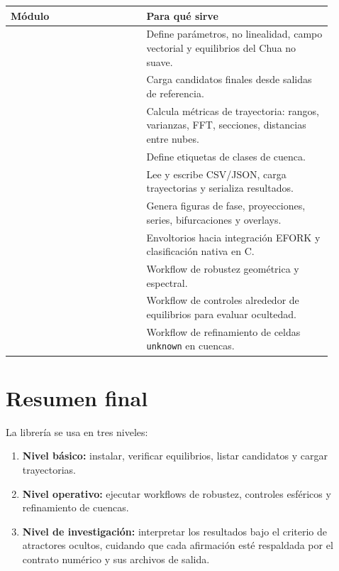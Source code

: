 \documentclass[11pt,letterpaper]{article}
\begin{document}
\begin{center}
\begin{tabular}{L{0.38\linewidth}L{0.52\linewidth}}
\toprule
Módulo & Para qué sirve \\
\midrule
{} & Define parámetros, no linealidad, campo vectorial y equilibrios del Chua no suave. \\
 & Carga candidatos finales desde salidas de referencia. \\
 & Calcula métricas de trayectoria: rangos, varianzas, FFT, secciones, distancias entre nubes. \\
 & Define etiquetas de clases de cuenca. \\
 & Lee y escribe CSV/JSON, carga trayectorias y serializa resultados. \\
 & Genera figuras de fase, proyecciones, series, bifurcaciones y overlays. \\
 & Envoltorios hacia integración EFORK y clasificación nativa en C. \\
 & Workflow de robustez geométrica y espectral. \\
 & Workflow de controles alrededor de equilibrios para evaluar ocultedad. \\
 & Workflow de refinamiento de celdas \texttt{unknown} en cuencas. \\
\bottomrule
\end{tabular}
\end{center}

\section{Resumen final}

La librería se usa en tres niveles:

\begin{enumerate}[label=\arabic*)]
  \item \textbf{Nivel básico:} instalar, verificar equilibrios, listar candidatos y cargar trayectorias.
  \item \textbf{Nivel operativo:} ejecutar workflows de robustez, controles esféricos y refinamiento de cuencas.
  \item \textbf{Nivel de investigación:} interpretar los resultados bajo el criterio de atractores ocultos, cuidando que cada afirmación esté respaldada por el contrato numérico y sus archivos de salida.
\end{enumerate}
\end{document}
